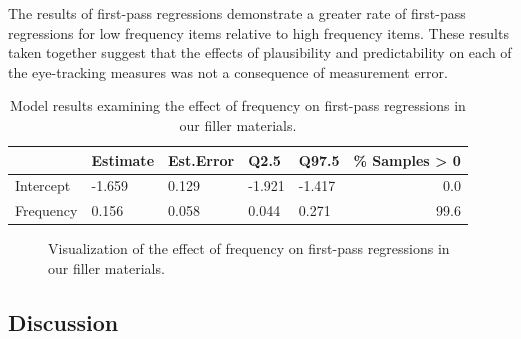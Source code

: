 \documentclass[
  12pt,
  letterpaper,
]{scrreprt}
\begin{document}
The results of first-pass regressions demonstrate a greater rate of
first-pass regressions for low frequency items relative to high
frequency items. These results taken together suggest that the effects
of plausibility and predictability on each of the eye-tracking measures
was not a consequence of measurement error.

\begin{longtable}[]{@{}lllllr@{}}

\caption{\label{tbl-firstpassregressionfiller}Model results examining
the effect of frequency on first-pass regressions in our filler
materials.}

\tabularnewline

\toprule\noalign{}
& Estimate & Est.Error & Q2.5 & Q97.5 & \% Samples \textgreater{} 0 \\
\midrule\noalign{}
\endhead
\bottomrule\noalign{}
\endlastfoot
Intercept & -1.659 & 0.129 & -1.921 & -1.417 & 0.0 \\
Frequency & 0.156 & 0.058 & 0.044 & 0.271 & 99.6 \\

\end{longtable}

\begin{figure}[htbp]

\caption{\label{fig-firstpassregressionfiller}Visualization of the
effect of frequency on first-pass regressions in our filler materials.}


\end{figure}%

\subsection{Discussion}\label{discussion-3}
\end{document}
